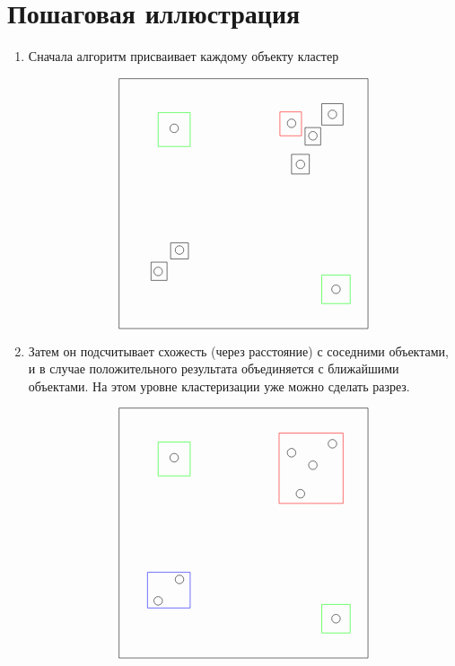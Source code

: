 \documentclass[12pt, a4paper]{article}
\begin{document}
\section*{Пошаговая иллюстрация}

\begin{enumerate}
\item Сначала алгоритм присваивает каждому объекту кластер

\[
\begin{tikzpicture}
    
    \draw (-3.5, 3.5) -- (3.5, 3.5);
    \draw (-3.5, -3.5) -- (3.5, -3.5);
    \draw (-3.5, -3.5) -- (-3.5, 3.5);
    \draw (3.5, 3.5) -- (3.5, -3.5);
        
    \draw (2.5, 2.5) circle (0.12);
    \draw (1.35, 2.25) circle (0.12);
    \draw (1.6, 1.1) circle (0.12);
    \draw (1.95, 1.9) circle (0.12);
    \draw (-2.4, -1.9) circle (0.12);
    \draw (-1.8, -1.3) circle (0.12);
    \draw (-1.95, 2.11) circle (0.12);
    \draw (2.6, -2.4) circle (0.12);
        
    \draw (-2.6, -2.15) rectangle (-2.15, -1.64);
    \draw (-2.05, -1.55) rectangle (-1.55, -1.1);
    \draw[green] (2.2, -2.8) rectangle (3, -2);
    \draw (2.2, 2.2) rectangle (2.8, 2.8);
    \draw[red] (1.023, 1.9) rectangle (1.63, 2.57);
    \draw (1.73, 1.64) rectangle (2.17, 2.13);
    \draw (1.35, 0.83) rectangle (1.85, 1.38);
    \draw[green] (-2.4, 1.6) rectangle (-1.5, 2.55);

\end{tikzpicture}
\]

\item Затем он подсчитывает схожесть (через расстояние) с соседними объектами, и в случае положительного результата объединяется с ближайшими объектами. На этом уровне кластеризации уже можно сделать разрез.

\[
\begin{tikzpicture}
    \draw (-3.5, 3.5) -- (3.5, 3.5);
    \draw (-3.5, -3.5) -- (3.5, -3.5);
    \draw (-3.5, -3.5) -- (-3.5, 3.5);
    \draw (3.5, 3.5) -- (3.5, -3.5);
        
    \draw (2.5, 2.5) circle (0.12);
    \draw (1.35, 2.25) circle (0.12);
    \draw (1.6, 1.1) circle (0.12);
    \draw (1.95, 1.9) circle (0.12);
    \draw (-2.4, -1.9) circle (0.12);
    \draw (-1.8, -1.3) circle (0.12);
    \draw (-1.95, 2.11) circle (0.12);
    \draw (2.6, -2.4) circle (0.12);
        
    \draw[blue] (-2.7, -2.1) rectangle (-1.5, -1.1);
    \draw[green] (2.2, -2.8) rectangle (3, -2);
    \draw[red] (1, 0.83) rectangle (2.8, 2.8);
    \draw[green] (-2.4, 1.6) rectangle (-1.5, 2.55);
\end{tikzpicture}
\]


\end{enumerate}
\end{document}
